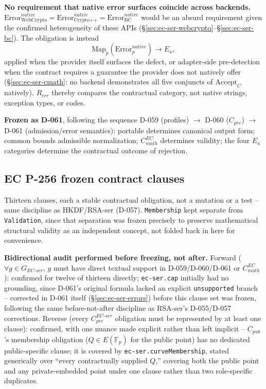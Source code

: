 \documentclass[11pt,a4paper]{article}
\begin{document}
\textbf{No requirement that native error surfaces coincide across backends.} $\text{Error}_{\text{WebCrypto}}^{native} = \text{Error}_{\text{Crypto++}}^{native} = \text{Error}_{\text{BC}}^{native}$ would be an absurd requirement given the confirmed heterogeneity of these APIs (\S\ref{sec:ec-ser-webcrypto}--\S\ref{sec:ec-ser-bc}). The obligation is instead
\[
\text{Map}_p(\text{Error}_p^{native}) \to E_\kappa,
\]
applied when the provider itself surfaces the defect, or adapter-side pre-detection when the contract requires a guarantee the provider does not natively offer (\S\ref{sec:ec-ser-cmath}: no backend demonstrates all five conjuncts of $\text{Accept}_C$ natively). $R_{err}$ thereby compares the contractual category, not native strings, exception types, or codes.

\textbf{Frozen as D-061}, following the sequence D-059 (profiles) $\to$ D-060 ($C_{pre}$) $\to$ D-061 (admission/error semantics): portable determines canonical output form; common bounds admissible normalization; $C_{math}^{EC}$ determines validity; the four $E_\kappa$ categories determine the contractual outcome of rejection.

\subsection{EC P-256 frozen contract clauses}\label{sec:ec-ser-clauses}

Thirteen clauses, each a stable contractual obligation, not a mutation or a test -- same discipline as HKDF/RSA-ser (D-057). \texttt{Membership} kept separate from \texttt{Validation}, since that separation was frozen precisely to preserve mathematical structural validity as an independent concept, not folded back in here for convenience.

\textbf{Bidirectional audit performed before freezing, not after.} Forward ($\forall g\in G_{EC\text{-}ser}$, $g$ must have direct textual support in D-059/D-060/D-061 or $C_{math}^{EC}$): confirmed for twelve of thirteen directly; \texttt{ec-ser.cap} initially had no grounding, since D-061's original formula lacked an explicit \texttt{unsupported} branch -- corrected in D-061 itself (\S\ref{sec:ec-ser-errors}) before this clause set was frozen, following the same before-not-after discipline as RSA-ser's D-055/D-057 corrections. Reverse (every $C_{pre}^{EC\text{-}ser}$ obligation must be represented by at least one clause): confirmed, with one nuance made explicit rather than left implicit -- $C_{pub}$'s membership obligation ($Q\in E(\mathbb{F}_p)$ for the public point) has no dedicated public-specific clause; it is covered by \texttt{ec-ser.curveMembership}, stated generically over ``every contractually supplied $Q$,'' covering both the public point and any private-embedded point under one clause rather than two role-specific duplicates.
\end{document}
